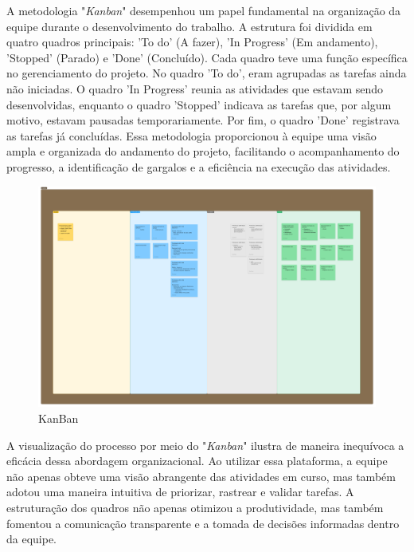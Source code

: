A metodologia "\textit{Kanban}"  desempenhou um papel fundamental na organização da equipe durante o desenvolvimento do trabalho. A estrutura foi dividida em quatro quadros principais: 'To do' (A fazer), 'In Progress' (Em andamento), 'Stopped' (Parado) e 'Done' (Concluído). Cada quadro teve uma função específica no gerenciamento do projeto. No quadro 'To do', eram agrupadas as tarefas ainda não iniciadas. O quadro 'In Progress' reunia as atividades que estavam sendo desenvolvidas, enquanto o quadro 'Stopped' indicava as tarefas que, por algum motivo, estavam pausadas temporariamente. Por fim, o quadro 'Done' registrava as tarefas já concluídas. Essa metodologia proporcionou à equipe uma visão ampla e organizada do andamento do projeto, facilitando o acompanhamento do progresso, a identificação de gargalos e a eficiência na execução das atividades.

\begin{figure}[!h]
\centering
\caption{KanBan}%
\label{fig:kanbam}
\includegraphics[scale=0.08]{Illustrations/KanBan.png}
\end{figure}

A visualização do processo por meio do "\textit{Kanban}" ilustra de maneira inequívoca a eficácia dessa abordagem organizacional. Ao utilizar essa plataforma, a equipe não apenas obteve uma visão abrangente das atividades em curso, mas também adotou uma maneira intuitiva de priorizar, rastrear e validar tarefas. A estruturação dos quadros não apenas otimizou a produtividade, mas também fomentou a comunicação transparente e a tomada de decisões informadas dentro da equipe.